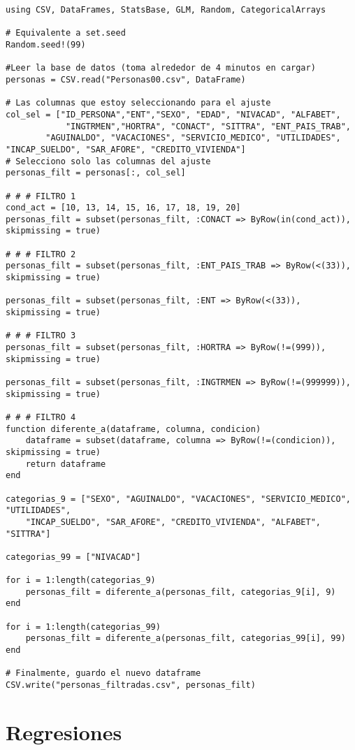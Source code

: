 \begin{verbatim}
using CSV, DataFrames, StatsBase, GLM, Random, CategoricalArrays

# Equivalente a set.seed
Random.seed!(99)

#Leer la base de datos (toma alrededor de 4 minutos en cargar)
personas = CSV.read("Personas00.csv", DataFrame)

# Las columnas que estoy seleccionando para el ajuste
col_sel = ["ID_PERSONA","ENT","SEXO", "EDAD", "NIVACAD", "ALFABET", 
            "INGTRMEN","HORTRA", "CONACT", "SITTRA", "ENT_PAIS_TRAB",
        "AGUINALDO", "VACACIONES", "SERVICIO_MEDICO", "UTILIDADES", "INCAP_SUELDO", "SAR_AFORE", "CREDITO_VIVIENDA"]
# Selecciono solo las columnas del ajuste
personas_filt = personas[:, col_sel]    

# # # FILTRO 1
cond_act = [10, 13, 14, 15, 16, 17, 18, 19, 20]
personas_filt = subset(personas_filt, :CONACT => ByRow(in(cond_act)), skipmissing = true)

# # # FILTRO 2
personas_filt = subset(personas_filt, :ENT_PAIS_TRAB => ByRow(<(33)), skipmissing = true)

personas_filt = subset(personas_filt, :ENT => ByRow(<(33)), skipmissing = true)

# # # FILTRO 3
personas_filt = subset(personas_filt, :HORTRA => ByRow(!=(999)), skipmissing = true)

personas_filt = subset(personas_filt, :INGTRMEN => ByRow(!=(999999)), skipmissing = true)

# # # FILTRO 4
function diferente_a(dataframe, columna, condicion)
    dataframe = subset(dataframe, columna => ByRow(!=(condicion)), skipmissing = true)
    return dataframe
end

categorias_9 = ["SEXO", "AGUINALDO", "VACACIONES", "SERVICIO_MEDICO", "UTILIDADES", 
    "INCAP_SUELDO", "SAR_AFORE", "CREDITO_VIVIENDA", "ALFABET", "SITTRA"]

categorias_99 = ["NIVACAD"]

for i = 1:length(categorias_9)
    personas_filt = diferente_a(personas_filt, categorias_9[i], 9)
end

for i = 1:length(categorias_99)
    personas_filt = diferente_a(personas_filt, categorias_99[i], 99)
end

# Finalmente, guardo el nuevo dataframe
CSV.write("personas_filtradas.csv", personas_filt)
\end{verbatim}


\section{Regresiones}

